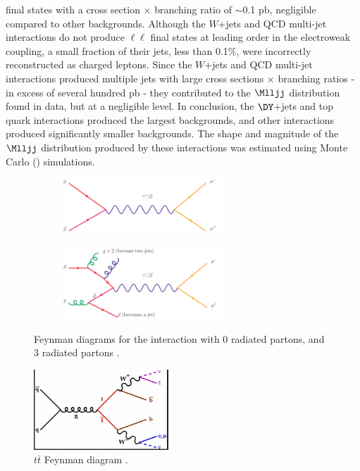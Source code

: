 final states with a cross section $\times$ branching ratio of $\sim$0.1 pb, negligible compared to other backgrounds.  Although 
the $W$+jets and QCD multi-jet interactions do not produce $\ell\ell$ final states at leading order in the electroweak coupling, 
a small fraction of their jets, less than 0.1\%, were incorrectly reconstructed as charged leptons.  Since the $W$+jets and QCD 
multi-jet interactions produced multiple jets with large cross sections $\times$ branching ratios - in excess of several hundred pb 
\cite{wJetsMeas,jetProductionMeas} - they contributed to the $\Mlljj$ distribution found in data, but at a negligible level.  
In conclusion, the $\DY$+jets and top quark interactions produced the largest backgrounds, and other interactions produced significantly 
smaller backgrounds.  The shape and magnitude of the $\Mlljj$ distribution produced by these interactions was estimated using 
Monte Carlo (\MC) simulations.

\clearpage

\begin{figure}
	\centering
	\begin{subfigure}[t]{2.4in}
		\centering
		\includegraphics[width=2.4in]{figures/dyNoJetFeynDiagram.png}
	\end{subfigure}
	\thickspace
	\begin{subfigure}[t]{2.4in}
		\centering
		\includegraphics[width=2.4in]{figures/dyThreeJetFeynDiagram.png}
	\end{subfigure}
	\caption{Feynman diagrams for the \DY interaction with 0 radiated partons, and 3 radiated partons \cite{dyDiagrams}.}
	\label{fig:dyDiags}
\end{figure}

\begin{figure}[h]
	\centering
	\includegraphics[width=0.45\textwidth]{figures/topAntiTopFeynDiagram.png}
	\caption{$t\bar{t}$ Feynman diagram \cite{ttbarDiagram}.}
	\label{fig:ttbarDiag}
\end{figure}

